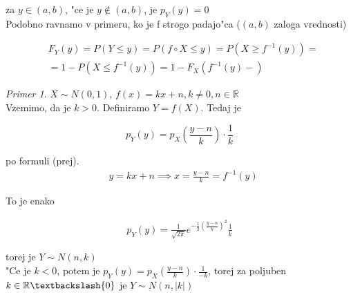 \documentclass[a4paper,12pt]{article}
\theoremstyle{definition}
\theoremstyle{remark}
\newtheorem*{ex}{Primer}
\newcommand{\R}{\mathbb{R}}
\begin{document}
za $y \in (a,b)$, "ce je $y \notin (a,b)$, je $p_Y(y) = 0$ \\
Podobno ravnamo v primeru, ko je f strogo padajo"ca ($(a,b)$ zaloga vrednosti)

\begin{align*}
    &F_Y(y) = P(Y \leq y) = P(f \circ X \leq y) = P(X \geq f^{-1}(y)) = \\
    &= 1 - P(X \leq f^{-1}(y)) = 1 - F_X(f^{-1}(y)-)
\end{align*}

\begin{ex}
    $X \sim N(0,1)$, $f(x) = kx + n, k \neq 0, n \in \R$ \\
    Vzemimo, da je $k > 0$. Definiramo $Y = f(X)$. Tedaj je

    \begin{equation*}
        p_Y(y) = p_X(\frac{y - n}{k}) \cdot \frac{1}{k}
    \end{equation*}

    po formuli (prej).
    \begin{align*}
        &y = kx + n \implies x = \frac{y-n}{k} = f^{-1}(y)
    \end{align*}

    To je enako

    \begin{align*}
        p_Y(y) = \frac{1}{\sqrt{2\pi}} e^{-\frac{1}{2} (\frac{y-n}{k})^2} \frac{1}{k}
    \end{align*}

    torej je $Y \sim N(n, k)$ \\
    "Ce je $k < 0$, potem je $p_Y(y) = p_X(\frac{y-n}{k}) \cdot \frac{1}{-k}$, torej za poljuben
    $k \in \R \textbackslash \{0\}$ je $Y \sim N(n, |k|)$
\end{ex}
\end{document}
